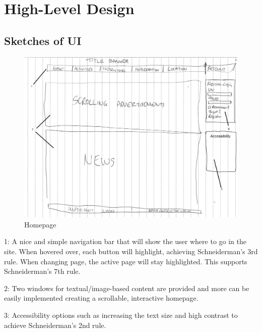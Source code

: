 \documentclass[11pt, article]{article}
\begin{document}
	\section{High-Level Design}

	\subsection{Sketches of UI}

			\begin{figure}[ht!]
	\includegraphics[scale=0.7]{images/homepage}
 	\caption{Homepage}
	\end{figure}
1: A nice and simple navigation bar that will show the user where to go in the site. When hovered over, each button will highlight, achieving Schneiderman's 3rd rule. When changing page, the active page will stay highlighted. This supports Schneiderman's 7th rule.

2: Two windows for textual/image-based content are provided and more can be easily implemented creating a scrollable, interactive homepage.

3: Accessibility options such as increasing the text size and high contrast to achieve Schneiderman's 2nd rule.
\end{document}
